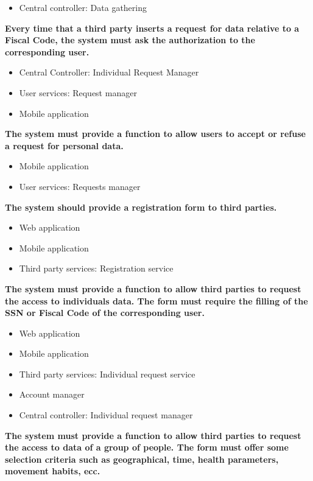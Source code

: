 \begin{enumerate} [label={\bf[R\arabic*]}]
\begin{itemize}
            \item Central controller: Data gathering
        \end{itemize}
    \item \textbf{Every time that a third party inserts a request for data relative to a Fiscal Code, the system must ask the authorization to the corresponding user.}
        \begin{itemize}
            \item Central Controller: Individual Request Manager
            \item User services: Request manager
            \item Mobile application
        \end{itemize}
    \item \textbf{The system must provide a function to allow users to accept or refuse a request for personal data.}
        \begin{itemize}
            \item Mobile application
            \item User services: Requests manager
        \end{itemize}
    \item \textbf{The system should provide a registration form to third parties.}
        \begin{itemize}
            \item Web application
            \item Mobile application
            \item Third party services: Registration service
        \end{itemize}
    \item \textbf{The system must provide a function to allow third parties to request the access to individuals data. The form must require the filling of the SSN or Fiscal Code of the corresponding user.}
        \begin{itemize}
            \item Web application
            \item Mobile application
            \item Third party services: Individual request service
            \item Account manager
            \item Central controller: Individual request manager
        \end{itemize}
    \item \textbf{The system must provide a function to allow third parties to request the access to data of a group of people. The form must offer some selection criteria such as geographical, time, health parameters, movement habits, ecc.}

\end{enumerate}
